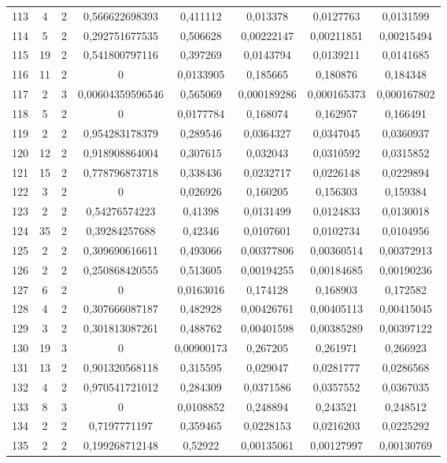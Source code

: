 \begin{longtable}{|c|c|c|c|c|c|c|c|}
113 & 4 & 2 & 0,566622698393 & 0,411112 & 0,013378 & 0,0127763 & 0,0131599  \\
114 & 5 & 2 & 0,292751677535 & 0,506628 & 0,00222147 & 0,00211851 & 0,00215494  \\
115 & 19 & 2 & 0,541800797116 & 0,397269 & 0,0143794 & 0,0139211 & 0,0141685  \\
116 & 11 & 2 & 0 & 0,0133905 & 0,185665 & 0,180876 & 0,184348  \\
117 & 2 & 3 & 0,00604359596546 & 0,565069 & 0,000189286 & 0,000165373 & 0,000167802  \\
118 & 5 & 2 & 0 & 0,0177784 & 0,168074 & 0,162957 & 0,166491  \\
119 & 2 & 2 & 0,954283178379 & 0,289546 & 0,0364327 & 0,0347045 & 0,0360937  \\
120 & 12 & 2 & 0,918908864004 & 0,307615 & 0,032043 & 0,0310592 & 0,0315852  \\
121 & 15 & 2 & 0,778796873718 & 0,338436 & 0,0232717 & 0,0226148 & 0,0229894  \\
122 & 3 & 2 & 0 & 0,026926 & 0,160205 & 0,156303 & 0,159384  \\
123 & 2 & 2 & 0,54276574223 & 0,41398 & 0,0131499 & 0,0124833 & 0,0130018  \\
124 & 35 & 2 & 0,39284257688 & 0,42346 & 0,0107601 & 0,0102734 & 0,0104956  \\
125 & 2 & 2 & 0,309690616611 & 0,493066 & 0,00377806 & 0,00360514 & 0,00372913  \\
126 & 2 & 2 & 0,250868420555 & 0,513605 & 0,00194255 & 0,00184685 & 0,00190236  \\
127 & 6 & 2 & 0 & 0,0163016 & 0,174128 & 0,168903 & 0,172582  \\
128 & 4 & 2 & 0,307666087187 & 0,482928 & 0,00426761 & 0,00405113 & 0,00415045  \\
129 & 3 & 2 & 0,301813087261 & 0,488762 & 0,00401598 & 0,00385289 & 0,00397122  \\
130 & 19 & 3 & 0 & 0,00900173 & 0,267205 & 0,261971 & 0,266923  \\
131 & 13 & 2 & 0,901320568118 & 0,315595 & 0,029047 & 0,0281777 & 0,0286568  \\
132 & 4 & 2 & 0,970541721012 & 0,284309 & 0,0371586 & 0,0357552 & 0,0367035  \\
133 & 8 & 3 & 0 & 0,0108852 & 0,248894 & 0,243521 & 0,248512  \\
134 & 2 & 2 & 0,7197771197 & 0,359465 & 0,0228153 & 0,0216203 & 0,0225292  \\
135 & 2 & 2 & 0,199268712148 & 0,52922 & 0,00135061 & 0,00127997 & 0,00130769  \\

\end{longtable}
